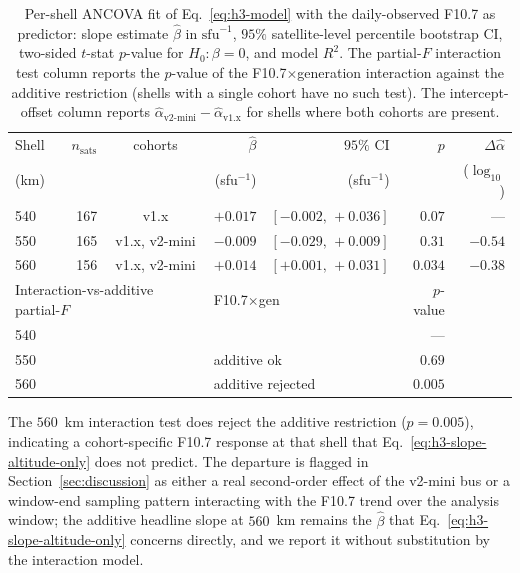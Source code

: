 \documentclass[10pt, letterpaper]{article}
\begin{document}
\begin{table}[ht]
  \centering
  \caption{Per-shell ANCOVA fit of
  Eq.~\eqref{eq:h3-model} with the daily-observed F10.7 as
  predictor: slope estimate $\hat\beta$ in $\text{sfu}^{-1}$, $95\%$
  satellite-level percentile bootstrap CI, two-sided $t$-stat
  $p$-value for $H_{0}\!:\beta = 0$, and model $R^{2}$. The
  partial-$F$ interaction test column reports the $p$-value of
  the F10.7$\times$generation interaction against the additive
  restriction (shells with a single cohort have no such test).
  The intercept-offset column reports
  $\hat\alpha_{\mathrm{v2\text{-}mini}} - \hat\alpha_{\mathrm{v1.x}}$
  for shells where both cohorts are present.}
  \label{tab:h3-fits}
  \begin{tabular}{lrcrrrr}
    \toprule
    Shell & $n_{\mathrm{sats}}$ & cohorts & $\hat\beta$ & $95\%$ CI &
    $p$ & $\Delta\hat\alpha$ \\
    (km) & & & (sfu$^{-1}$) & (sfu$^{-1}$) & & ($\log_{10}$) \\
    \midrule
    540 & 167 & v1.x & $+0.017$ &
      $[-0.002,\,+0.036]$ & $0.07$ & --- \\
    550 & 165 & v1.x, v2-mini & $-0.009$ &
      $[-0.029,\,+0.009]$ & $0.31$ & $-0.54$ \\
    560 & 156 & v1.x, v2-mini & $+0.014$ &
      $[+0.001,\,+0.031]$ & $0.034$ & $-0.38$ \\
    \midrule
    \multicolumn{3}{l}{Interaction-vs-additive partial-$F$}
      & \multicolumn{2}{l}{F10.7$\times$gen} & $p$-value & \\
    \midrule
    540 & & & & & --- & \\
    550 & & & \multicolumn{2}{l}{additive ok} & $0.69$ & \\
    560 & & & \multicolumn{2}{l}{additive rejected} & $0.005$ & \\
    \bottomrule
  \end{tabular}
\end{table}

The $560$~km interaction test does reject the additive restriction
($p = 0.005$), indicating a cohort-specific F10.7 response at that
shell that Eq.~\eqref{eq:h3-slope-altitude-only} does not predict.
The departure is flagged in Section~\ref{sec:discussion} as either
a real second-order effect of the v2-mini bus or a window-end
sampling pattern interacting with the F10.7 trend over the analysis
window; the additive headline slope at $560$~km remains the
$\hat\beta$ that
Eq.~\eqref{eq:h3-slope-altitude-only} concerns directly, and we
report it without substitution by the interaction model.
\end{document}
